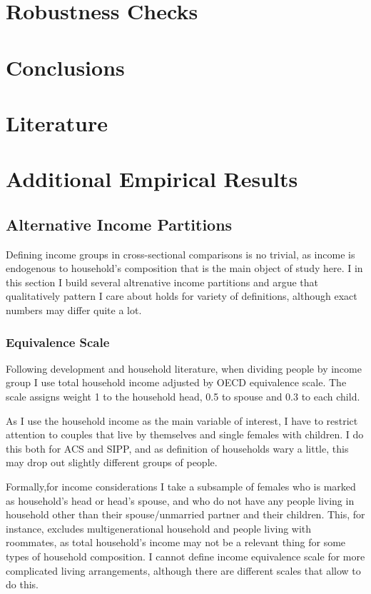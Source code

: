 \documentclass[12pt,letter]{article}
\begin{document}
\section{Robustness Checks}
\section{Conclusions}
\clearpage
\section*{Literature}



\newpage
\appendix
\section{Additional Empirical Results}
\subsection{Alternative Income Partitions\label{inc-part}}

Defining income groups in cross-sectional comparisons is no trivial, as income is endogenous to household's composition that is the main object of study here. I in this section I build several altrenative income partitions and argue that qualitatively pattern I care about holds for variety of definitions, although exact numbers may differ quite a lot.



\subsubsection{Equivalence Scale}

Following development and household literature, when dividing people by income group I use total household income adjusted by OECD equivalence scale. The scale assigns weight 1 to the household head, 0.5 to spouse and 0.3 to each child.

As I use the household income as the main variable of interest, I have to restrict attention to couples that live by themselves and single females with children. I do this both for ACS and SIPP, and as definition of households wary a little, this may drop out slightly different groups of people.

Formally,for income considerations I take a subsample of females who is marked as household's head or head's spouse, and who do not have any people living in household other than their spouse/unmarried partner and their children. This, for instance, excludes multigenerational household and people living with roommates, as total household's income may not be a relevant thing for some types of household composition. I cannot define income equivalence scale for more complicated living arrangements, although there are different scales that allow to do this.
\end{document}
